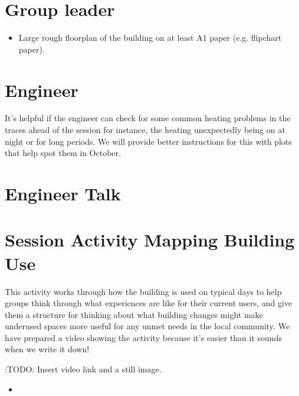 \documentclass[letterpaper,10pt,english]{jupyterBook}
\begin{document}
\section{Group leader}
\label{\detokenize{session3/details/preparation:group-leader}}\begin{itemize}
\item {} 
\sphinxAtStartPar
Large rough floorplan of the building on at least A1 paper (e.g. flipchart paper).

\end{itemize}


\section{Engineer}
\label{\detokenize{session3/details/preparation:engineer}}
\sphinxAtStartPar
It’s helpful if the engineer can check for some common heating problems in the traces ahead of the session \sphinxhyphen{} for instance, the heating unexpectedly being on at night or for long periods.  We will provide better instructions for this with plots that help spot them in October.

\sphinxstepscope


\section{Engineer Talk}
\label{\detokenize{session3/details/session-concepts:engineer-talk}}\label{\detokenize{session3/details/session-concepts::doc}}
\sphinxstepscope


\section{Session Activity \sphinxhyphen{} Mapping Building Use}
\label{\detokenize{session3/details/activity:session-activity-mapping-building-use}}\label{\detokenize{session3/details/activity::doc}}
\sphinxAtStartPar
This activity works through how the building is used on typical days to help groups think through what experiences are like for their current users, and give them a structure for thinking about what building changes might make under\sphinxhyphen{}used spaces more useful for any unmet needs in the local community.  We have prepared a video showing the activity because it’s easier than it sounds when we write it down!

\sphinxAtStartPar
:TODO:  Insert video link and a still image.
\begin{itemize}
\item {} 
\sphinxAtStartPar
{}

\end{itemize}
\end{document}

